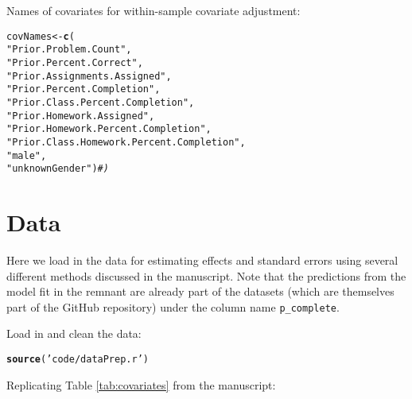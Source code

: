 \documentclass[12pt]{article}\usepackage[]{graphicx}\usepackage[]{xcolor}
\makeatletter
\newcommand{\hlstr}[1]{\textcolor[rgb]{0.192,0.494,0.8}{#1}}%
\newcommand{\hlcom}[1]{\textcolor[rgb]{0.678,0.584,0.686}{\textit{#1}}}%
\newcommand{\hlstd}[1]{\textcolor[rgb]{0.345,0.345,0.345}{#1}}%
\newcommand{\hlkwb}[1]{\textcolor[rgb]{0.69,0.353,0.396}{#1}}%
\newcommand{\hlkwd}[1]{\textcolor[rgb]{0.737,0.353,0.396}{\textbf{#1}}}%
\newenvironment{kframe}{%
 \def\at@end@of@kframe{}%
 \ifinner\ifhmode%
  \def\at@end@of@kframe{\end{minipage}}%
  \begin{minipage}{\columnwidth}%
 \fi\fi%
 \def\FrameCommand##1{\hskip\@totalleftmargin \hskip-\fboxsep
 \colorbox{shadecolor}{##1}\hskip-\fboxsep
     \hskip-\linewidth \hskip-\@totalleftmargin \hskip\columnwidth}%
 \MakeFramed {\advance\hsize-\width
   \@totalleftmargin\z@ \linewidth\hsize
   \@setminipage}}%
 {\par\unskip\endMakeFramed%
 \at@end@of@kframe}
\newenvironment{knitrout}{}{} %
\makeatother
\begin{document}
Names of covariates for within-sample covariate adjustment:
\begin{knitrout}
\color{fgcolor}\begin{kframe}
\begin{alltt}
\hlstd{covNames} \hlkwb{<-} \hlkwd{c}\hlstd{(}
    \hlstr{"Prior.Problem.Count"}\hlstd{,}
    \hlstr{"Prior.Percent.Correct"}\hlstd{,}
    \hlstr{"Prior.Assignments.Assigned"}\hlstd{,}
    \hlstr{"Prior.Percent.Completion"}\hlstd{,}
    \hlstr{"Prior.Class.Percent.Completion"}\hlstd{,}
    \hlstr{"Prior.Homework.Assigned"}\hlstd{,}
    \hlstr{"Prior.Homework.Percent.Completion"}\hlstd{,}
    \hlstr{"Prior.Class.Homework.Percent.Completion"}\hlstd{,}
    \hlstr{"male"}\hlstd{,}
    \hlstr{"unknownGender"}\hlstd{)}\hlcom{#)}
\end{alltt}
\end{kframe}
\end{knitrout}

\section{Data}

Here we load in the data for estimating effects and standard errors
using several different methods discussed in the manuscript.
Note that the predictions from the model fit in the remnant are
already part of the datasets (which are themselves part of the GitHub
repository) under the column name \texttt{p\_complete}.

Load in and clean the data:\\

\begin{knitrout}
\color{fgcolor}\begin{kframe}
\begin{alltt}
\hlkwd{source}\hlstd{(}\hlstr{'code/dataPrep.r'}\hlstd{)}
\end{alltt}
\end{kframe}
\end{knitrout}

Replicating Table \ref{tab:covariates} from the manuscript:
\end{document}
